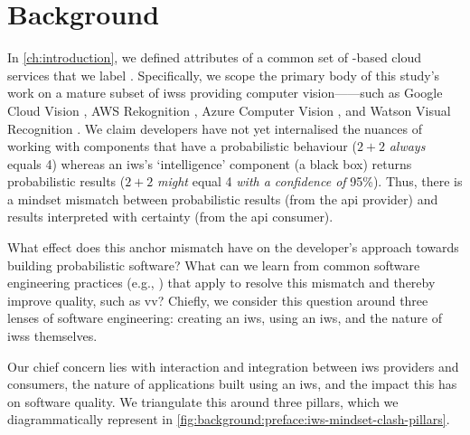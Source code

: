 \chapter{Background}
\label{ch:background}

\graphicspath{{mainmatter/background/figures/}}

\label{sec:background:preface}

In \cref{ch:introduction}, we defined attributes of a common set of -based cloud services that we label . Specifically, we scope the primary body of this study's work on a mature subset of \glspl{iws} providing computer vision------such as Google Cloud Vision , AWS Rekognition , Azure Computer Vision , and Watson Visual Recognition . We claim developers have not yet internalised the nuances of working with components that have a probabilistic behaviour ($2+2$ \textit{always} equals 4) whereas an \gls{iws}'s `intelligence' component (a black box) returns probabilistic results ($2+2$ \textit{might} equal 4 \textit{with a confidence of} 95\%). Thus, there is a mindset mismatch between probabilistic results (from the \gls{api} provider) and results interpreted with certainty (from the \gls{api} consumer).

What effect does this anchor mismatch have on the developer's approach towards building probabilistic software? What can we learn from common software engineering practices (e.g., \citep{Pressman:2005vf,Sommerville:2011uc}) that apply to resolve this mismatch and thereby improve quality, such as \gls{vv}? Chiefly, we consider this question around three lenses of software engineering: creating an \gls{iws}, using an \gls{iws}, and the nature of \glspl{iws} themselves.

Our chief concern lies with interaction and integration between \gls{iws} providers and consumers, the nature of applications built using an \gls{iws}, and the impact this has on software quality. We triangulate this around three pillars, which we diagrammatically represent in \cref{fig:background:preface:iws-mindset-clash-pillars}.
 
